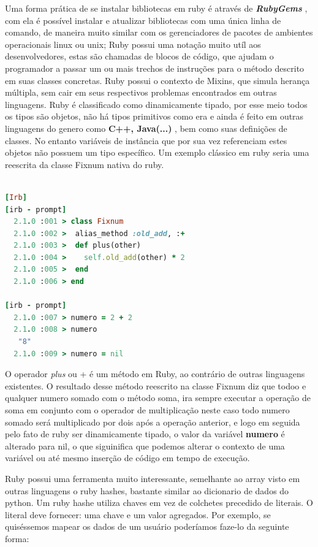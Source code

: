 Uma forma prática de se instalar bibliotecas em ruby é através de \textbf{ \textit{ RubyGems } }, com ela é possível instalar e atualizar bibliotecas com uma única linha de comando, de maneira muito similar com os gerenciadores de pacotes de ambientes operacionais linux ou unix; Ruby possui uma notação muito utíl aos desenvolvedores, estas são chamadas de blocos de código, que ajudam o programador a passar um ou mais trechos de instruções para o método descrito em suas classes concretas. Ruby possui o contexto de Mixins, que simula herança múltipla, sem cair em seus respectivos problemas encontrados em outras linguagens. Ruby é classificado como dinamicamente tipado, por esse meio todos os tipos são objetos, não há tipos primitivos como era e ainda é feito em outras linguagens do genero como \textbf{ C++, Java(...) }, bem como suas definições de classes. No entanto variáveis de instância que por sua vez referenciam estes objetos não possuem um tipo específico. Um exemplo clássico em ruby seria uma reescrita da classe Fixnum nativa do ruby.
\\
\\
{\singlespace
\begin{lstlisting}[caption=Exemplo de uma \textit{Reescrita} de Classe,language=Ruby,label={test}]
[Irb]
[irb - prompt]
  2.1.0 :001 > class Fixnum
  2.1.0 :002 >  alias_method :old_add, :+
  2.1.0 :003 >  def plus(other)
  2.1.0 :004 >    self.old_add(other) * 2
  2.1.0 :005 >  end
  2.1.0 :006 > end

[irb - prompt]
  2.1.0 :007 > numero = 2 + 2
  2.1.0 :008 > numero
   "8"
  2.1.0 :009 > numero = nil
\end{lstlisting}
}

O operador \textit{plus} ou + é um método em Ruby, ao contrário de outras linguagens existentes. O resultado desse método reescrito na classe Fixnum diz que todoo e qualquer numero somado com o método soma, ira sempre executar a operação de soma em conjunto com o operador de multiplicação neste caso todo numero somado será multiplicado por dois após a operação anterior, e logo em seguida pelo fato de ruby ser dinamicamente tipado, o valor da variável \textbf{numero} é alterado para nil, o que siguinifica que podemos alterar o contexto de uma variável ou até mesmo inserção de código em tempo de execução.

Ruby possui uma ferramenta muito interessante, semelhante ao array visto em outras linguagens o ruby hashes, bastante similar ao dicionario de dados do python. Um ruby hashe utiliza chaves em vez de colchetes precedido de literais. O literal deve fornecer: uma chave e um valor agregados.
Por exemplo, se quiséssemos mapear os dados de um usuário poderíamos faze-lo da seguinte forma:

